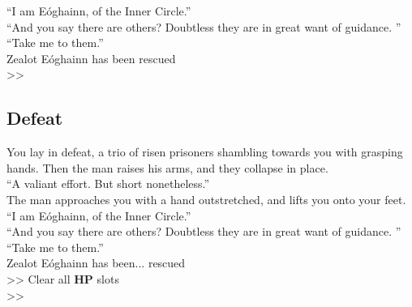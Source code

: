 “I am Eóghainn, of the Inner Circle.”\\

“And you say there are others? Doubtless they are in great want of guidance. ”\\

“Take me to them.”\\

 Zealot Eóghainn has been rescued\\
>> 

\subsection*{Defeat}
You lay in defeat, a trio of risen prisoners shambling towards you with grasping hands. Then the man raises his arms, and they collapse in place.\\

“A valiant effort. But short nonetheless.”\\

The man approaches you with a hand outstretched, and lifts you onto your feet.\\

“I am Eóghainn, of the Inner Circle.”\\

“And you say there are others? Doubtless they are in great want of guidance. ”\\

“Take me to them.”\\

 Zealot Eóghainn has been... rescued\\
>> Clear all \textbf{HP} slots\\
>> 